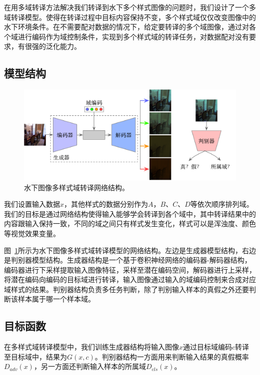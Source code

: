 在用多域转译方法解决我们转译到水下多个样式图像的问题时，我们设计了一个多域转译模型。使得在转译过程中目标内容保持不变，多个样式域仅仅改变图像中的水下环境条件。在不需要配对数据的情况下，给定要转译的多个域图像，通过对各个域进行编码作为域控制条件，实现到多个样式域的转译任务，对数据配对没有要求，有很强的泛化能力。

\subsection{模型结构}

\begin{figure}[ht]
    \centering
    \includegraphics[width=1\textwidth]{figures/Domain_network.pdf}
    \caption{水下图像多样式域转译网络结构。}
    \label{fig:domain_net}
\end{figure}

我们设置输入数据$x$，其他样式的数据分别作为$A$，$B$、$C$、$D$等依次顺序排列域。我们的目标是通过网络结构使得输入能够学会转译到各个域中，其中转译结果中的内容跟输入保持一致，不同的域之间只有样式发生变化，样式可以是浑浊度、颜色等视觉效果变量。

图~\ref{fig:domain_net}所示为水下图像多样式域转译模型的网络结构。左边是生成器模型结构，右边是判别器模型结构。生成器结构是一个基于卷积神经网络的编码器-解码器结构，编码器进行下采样提取输入图像特征，采样至潜在编码空间，解码器进行上采样，将潜在编码向编码的目标域进行转译，输入图像通过输入的域编码控制来合成对应域样式的结果。判别器结构负责多任务判断，除了判别输入样本的真假之外还要判断该样本属于哪一个样本域。

\subsection{目标函数}
在多样式域转译模型中，我们训练生成器结构将输入图像$x$通过目标域编码$c$转译至目标域中，结果为$G(x,c)$。判别器结构一方面用来判断输入结果的真假概率$D_{adv}(x)$，另一方面还判断输入样本的所属域$D_{cls}(x)$。

